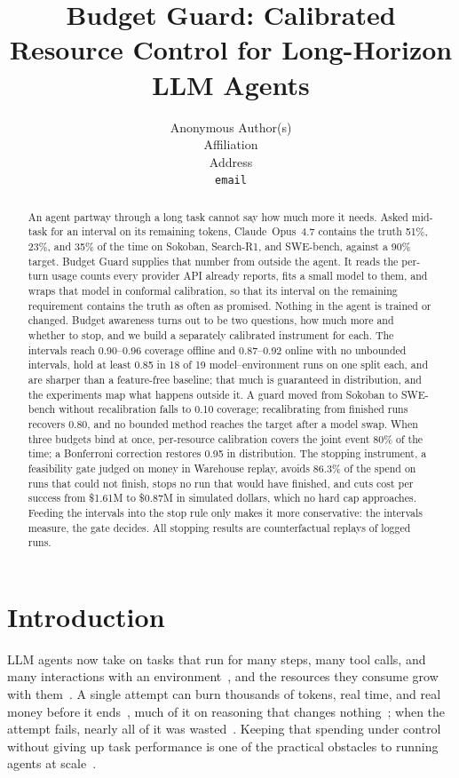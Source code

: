 \documentclass{article}
\title{Budget Guard: Calibrated Resource Control for Long-Horizon LLM Agents}
\author{
  Anonymous Author(s)\\
  Affiliation\\
  Address\\
  \texttt{email}
}
\begin{document}
\maketitle

\begin{abstract}
An agent partway through a long task cannot say how much more it needs. Asked mid-task for an interval on its remaining tokens, Claude~Opus~4.7 contains the truth 51\%, 23\%, and 35\% of the time on Sokoban, Search-R1, and SWE-bench, against a 90\% target. Budget Guard supplies that number from outside the agent. It reads the per-turn usage counts every provider API already reports, fits a small model to them, and wraps that model in conformal calibration, so that its interval on the remaining requirement contains the truth as often as promised. Nothing in the agent is trained or changed. Budget awareness turns out to be two questions, how much more and whether to stop, and we build a separately calibrated instrument for each. The intervals reach 0.90--0.96 coverage offline and 0.87--0.92 online with no unbounded intervals, hold at least 0.85 in 18 of 19 model--environment runs on one split each, and are sharper than a feature-free baseline; that much is guaranteed in distribution, and the experiments map what happens outside it. A guard moved from Sokoban to SWE-bench without recalibration falls to 0.10 coverage; recalibrating from finished runs recovers 0.80, and no bounded method reaches the target after a model swap. When three budgets bind at once, per-resource calibration covers the joint event 80\% of the time; a Bonferroni correction restores 0.95 in distribution. The stopping instrument, a feasibility gate judged on money in Warehouse replay, avoids 86.3\% of the spend on runs that could not finish, stops no run that would have finished, and cuts cost per success from \$1.61M to \$0.87M in simulated dollars, which no hard cap approaches. Feeding the intervals into the stop rule only makes it more conservative: the intervals measure, the gate decides. All stopping results are counterfactual replays of logged runs.
\end{abstract}

\raggedbottom
\section{Introduction}
\label{sec:intro}

LLM agents now take on tasks that run for many steps, many tool calls, and many interactions with an environment~\cite{kwa2025measuring}, and the resources they consume grow with them~\cite{chen2026token}. A single attempt can burn thousands of tokens, real time, and real money before it ends~\cite{bai2026how}, much of it on reasoning that changes nothing~\cite{sui2025stop,wang2025harnessing,yue2025dont}; when the attempt fails, nearly all of it was wasted~\cite{bai2026how}. Keeping that spending under control without giving up task performance is one of the practical obstacles to running agents at scale~\cite{chen2024frugalgpt,zellinger2025cost,davidov2026knowing}.
\end{document}
